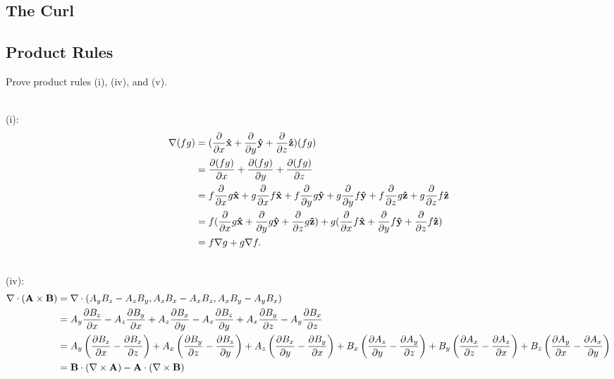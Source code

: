             \subsection{The Curl}
            \subsection{Product Rules}
            \begin{prob}[1.21]
                Prove product rules (i), (iv), and (v).
            \end{prob}
            \begin{sol}[1.21] ~\\
                \noindent (i):
                \begin{equation}
                    \begin{aligned}
                        \nabla(fg)&=(\frac{\partial }{\partial x}\mathbf{\hat{x}} + \frac{\partial }{\partial y}\mathbf{\hat{y}} + \frac{\partial }{\partial z}\mathbf{\hat{z}})(fg) \\
                            &=\frac{\partial (fg)}{\partial x} + \frac{\partial (fg)}{\partial y} + \frac{\partial (fg)}{\partial z} \\
                            &=f\frac{\partial }{\partial x}g\mathbf{\hat{x}} + g\frac{\partial }{\partial x}f\mathbf{\hat{x}} + f\frac{\partial }{\partial y}g\mathbf{\hat{y}} 
                                + g\frac{\partial }{\partial y}f\mathbf{\hat{y}} + f\frac{\partial }{\partial z}g\mathbf{\hat{z}} + g\frac{\partial }{\partial z}f\mathbf{\hat{z}} \\
                            &=f(\frac{\partial }{\partial x}g\mathbf{\hat{x}} + \frac{\partial }{\partial y}g\mathbf{\hat{y}} + \frac{\partial }{\partial z}g\mathbf{\hat{z}}) 
                                + g(\frac{\partial }{\partial x}f\mathbf{\hat{x}} + \frac{\partial }{\partial y}f\mathbf{\hat{y}} + \frac{\partial }{\partial z}f\mathbf{\hat{z}}) \\
                            &=f \nabla g + g \nabla f.
                    \end{aligned}
                \end{equation}
            \end{sol}
            ~\\
                \noindent (iv):
                \begin{equation}
                    \begin{aligned}
                        \nabla\cdot(\mathbf{A}\times\mathbf{B}) &=\nabla\cdot(A_y B_z - A_z B_y, A_z B_x - A_x B_z, A_x B_y - A_y B_x) \\
                        &=A_y \frac{\partial B_z}{\partial x} - A_z \frac{\partial B_y}{\partial x} + A_z\frac{\partial B_x}{\partial y} - A_x\frac{\partial B_z}{\partial y}
                            +A_x\frac{\partial B_y}{\partial z} - A_y \frac{\partial B_x}{\partial z} \\
                        &=A_y\left(\frac{\partial B_z}{\partial x} - \frac{\partial B_x}{\partial z}\right) + A_x\left(\frac{\partial B_y}{\partial z} - \frac{\partial B_z}{\partial y}\right) + A_z\left(\frac{\partial B_x}{\partial y} - \frac{\partial B_y}{\partial x}\right)
                            + B_x\left(\frac{\partial A_z}{\partial y} - \frac{\partial A_y}{\partial z}\right) + B_y\left(\frac{\partial A_x}{\partial z} - \frac{\partial A_z}{\partial x}\right) + B_z\left(\frac{\partial A_y}{\partial x} - \frac{\partial A_x}{\partial y}\right) \\
                        &=\mathbf{B}\cdot(\nabla\times\mathbf{A}) - \mathbf{A}\cdot(\nabla\times\mathbf{B})
                    \end{aligned}
                \end{equation}


